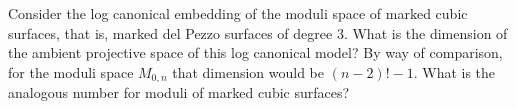 Consider the log canonical embedding of the moduli space of marked cubic surfaces, that is, marked del Pezzo surfaces of degree 3. What is the dimension of the ambient projective space of this log canonical model? By way of comparison, for the moduli space $M_{0,n}$ that dimension would be $(n-2)!-1$. What is the analogous number for moduli of marked cubic surfaces?
